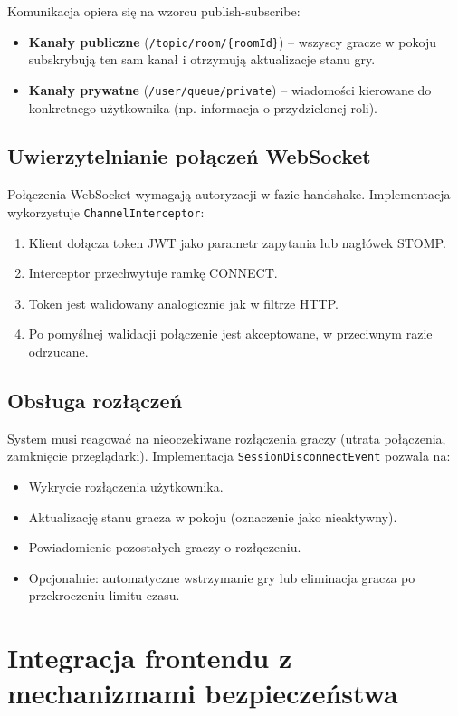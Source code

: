 ﻿\documentclass[a4paper,twoside,11pt]{mwrep}
\theoremstyle{plain} \newtheorem{thm}{Twierdzenie}
\theoremstyle{plain} \newtheorem{lem}{Lemat}
\theoremstyle{definition} \newtheorem{defn}{Definicja}
\theoremstyle{remark} \newtheorem*{rem}{Wniosek}
\begin{document}
Komunikacja opiera się na wzorcu publish-subscribe:
\begin{itemize}
    \item \textbf{Kanały publiczne} (\texttt{/topic/room/\{roomId\}}) -- wszyscy gracze w pokoju subskrybują ten sam kanał i otrzymują aktualizacje stanu gry.
    \item \textbf{Kanały prywatne} (\texttt{/user/queue/private}) -- wiadomości kierowane do konkretnego użytkownika (np. informacja o przydzielonej roli).
\end{itemize}

\subsection{Uwierzytelnianie połączeń WebSocket}

Połączenia WebSocket wymagają autoryzacji w fazie handshake. Implementacja wykorzystuje \texttt{ChannelInterceptor}:
\begin{enumerate}
    \item Klient dołącza token JWT jako parametr zapytania lub nagłówek STOMP.
    \item Interceptor przechwytuje ramkę CONNECT.
    \item Token jest walidowany analogicznie jak w filtrze HTTP.
    \item Po pomyślnej walidacji połączenie jest akceptowane, w przeciwnym razie odrzucane.
\end{enumerate}

\subsection{Obsługa rozłączeń}

System musi reagować na nieoczekiwane rozłączenia graczy (utrata połączenia, zamknięcie przeglądarki). Implementacja \texttt{SessionDisconnectEvent} pozwala na:
\begin{itemize}
    \item Wykrycie rozłączenia użytkownika.
    \item Aktualizację stanu gracza w pokoju (oznaczenie jako nieaktywny).
    \item Powiadomienie pozostałych graczy o rozłączeniu.
    \item Opcjonalnie: automatyczne wstrzymanie gry lub eliminacja gracza po przekroczeniu limitu czasu.
\end{itemize}

\section{Integracja frontendu z mechanizmami bezpieczeństwa}
\end{document}

